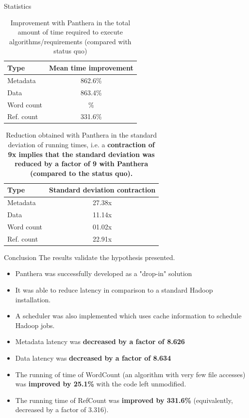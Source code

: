 \documentclass[final]{beamer} %
\begin{document}
\begin{frame}
\begin{columns}[t]
\begin{column}{0.32\textwidth}
    \begin{block}{Statistics}
	\begin{table}
	\setlength{\tabcolsep}{25pt}
	\centering
	\begin{tabular}{lc}
		\toprule
		\textbf{Type} & \textbf{Mean time improvement} \\
		\midrule
		Metadata   & 862.6\% \\
		Data       & 863.4\% \\
		Word count & \phantom025.1\% \\
		Ref. count & 331.6\% \\
	\bottomrule
	\end{tabular}
	\caption{Improvement with Panthera in the total amount of time required to execute algorithms/requirements (compared with status quo)}
	\end{table}
 	
 	\vspace{1em}
	\begin{table}
	\setlength{\tabcolsep}{25pt}
	\centering
	\begin{tabular}{lc}
		\toprule
		\textbf{Type} & \textbf{Standard deviation contraction} \\
		\midrule
		Metadata   & 27.38x \\
		Data       & 11.14x \\
		Word count &  \phantom01.02x \\
		Ref. count & 22.91x \\
	\bottomrule
	\end{tabular}
	\caption{Reduction obtained with Panthera in the standard deviation of running times, i.e. a \textbf{contraction of 9x implies that the standard deviation was reduced
	by a factor of 9 with Panthera (compared to the status quo).}}
	\end{table}

    \end{block}
    
    	\begin{block}{Conclusion}
    	The results validate the hypothesis presented.
    	\begin{itemize}
    		\item Panthera was successfully developed as a "drop-in" solution
    		\item It was able to reduce latency in comparison to a standard Hadoop installation. 
    		\item A scheduler was also implemented which uses cache information to schedule
    		Hadoop jobs.
    		\item Metadata latency was \textbf{decreased by a factor of 8.626}
    		\item Data latency was \textbf{decreased by a factor of 8.634}
    		\item The running of time of WordCount (an algorithm with very few file accesses) was \textbf{improved by 25.1\%} with the code left unmodified.
		\item The running time of RefCount was \textbf{improved by 331.6\%} (equivalently, decreased by a factor of 3.316).
    	\end{itemize}
	 

\end{block}
\end{column}
\end{columns}
\end{frame}
\end{document}
